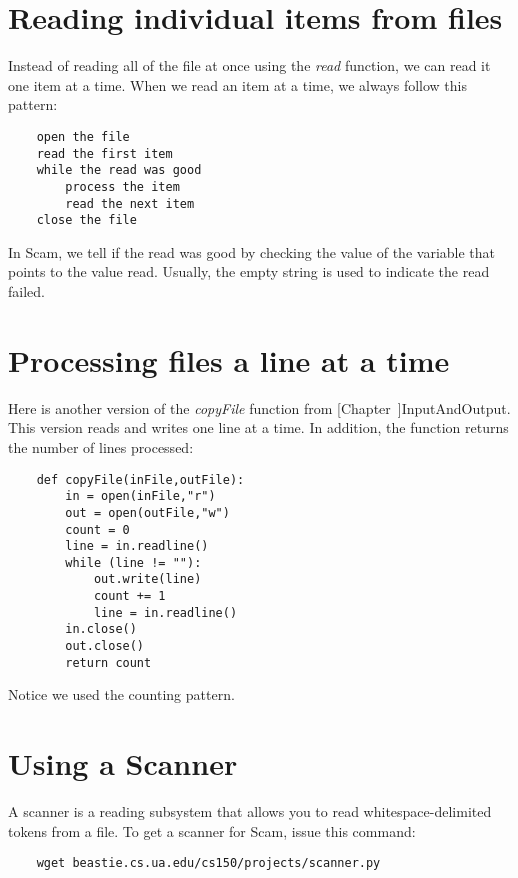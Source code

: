 \section{Reading individual items from files}

Instead of reading all of the file at once using the {\it read} function,
we can read it one item at a time. When we read an
item at a time, we always follow this pattern:

\begin{verbatim}
    open the file
    read the first item
    while the read was good
        process the item
        read the next item
    close the file
\end{verbatim}

In Scam, we tell if the read was good by checking the
value of the variable that points to the value read.
Usually, the empty string is used to indicate the
read failed.

\section*{Processing files a line at a time}

Here is another version of the {\it copyFile} function from
[Chapter~\Ref]{InputAndOutput}.
This version reads and writes
one line at a time. In addition, the function returns
the number of lines processed:

\begin{verbatim}
    def copyFile(inFile,outFile):
        in = open(inFile,"r")
        out = open(outFile,"w")
        count = 0
        line = in.readline()
        while (line != ""):
            out.write(line)
            count += 1
            line = in.readline()
        in.close()
        out.close()
        return count
\end{verbatim}
            
Notice we used the counting pattern.

\section*{Using a Scanner}

A scanner is a reading subsystem that allows you
to read whitespace-delimited tokens from a file.
To get a scanner for Scam, issue this command:

\begin{verbatim}
    wget beastie.cs.ua.edu/cs150/projects/scanner.py
\end{verbatim}

